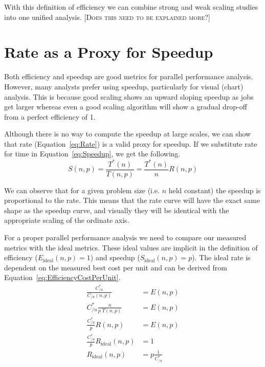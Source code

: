 \documentclass[conference]{IEEEtran}
\newcommand{\fix}[1]{{\color{red}\textsc{[#1]}}}
\begin{document}
With this definition of efficiency we can combine strong and weak scaling
studies into one unified analysis. \fix{Does this need to be explained
  more?}


\section{Rate as a Proxy for Speedup}
\label{sec:RateProxy}

Both efficiency and speedup are good metrics for parallel performance
analysis. However, many analysts prefer using speedup, particularly for
visual (chart) analysis. This is because good scaling shows an upward
sloping speedup as jobs get larger whereas even a good scaling algorithm
will show a gradual drop-off from a perfect efficiency of 1.

Although there is no way to compute the speedup at large scales, we can
show that rate (Equation~\ref{eq:Rate}) is a valid proxy for speedup. If we
substitute rate for time in Equation~\ref{eq:Speedup}, we get the
following.
\begin{equation}
  S(n,p) = \frac{T^*(n)}{T(n,p)} = \frac{T^*(n)}{n} R(n,p)
  \label{eq:SpeedupFromRate}
\end{equation}

We can observe that for a given problem size (i.e. $n$ held constant) the
speedup is proportional to the rate. This means that the rate curve will
have the exact same shape as the speedup curve, and visually they will be
identical with the appropriate scaling of the ordinate axis.

For a proper parallel performance analysis we need to compare our measured
metrics with the ideal metrics. These ideal values are implicit in the
definition of efficiency ($E_\mathrm{ideal}(n,p) = 1$) and speedup
($S_\mathrm{ideal}(n,p) = p$). The ideal rate is dependent on the measured
best cost per unit and can be derived from
Equation~\ref{eq:EfficiencyCostPerUnit}.
\begingroup
\addtolength{\jot}{1ex} %
\begin{align}
  \frac{C_{/u}^*}{C_{/u}(n,p)} &= E(n,p) \nonumber \\
  C_{/u}^* \frac{n}{p \; T(n,p)} &= E(n,p) \nonumber \\
  \frac{C_{/u}^*}{p} R(n,p) &= E(n,p) \nonumber \\
  \frac{C_{/u}^*}{p} R_\mathrm{ideal}(n,p) &= 1 \nonumber \\
  R_\mathrm{ideal}(n,p) &= p \frac{1}{C_{/u}^*}
\end{align}
\endgroup
\end{document}
